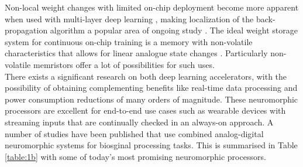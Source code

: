 \noindent Non-local weight changes with limited on-chip deployment become more apparent when used with multi-layer deep learning \cite{bellec2019eligibility}, making localization of the back-propagation algorithm a popular area of ongoing study \cite{sacramento2018dendritic}. The ideal weight storage system for continuous on-chip training is a memory with non-volatile characteristics that allows for linear analogue state changes \cite{valentian2019fully}. Particularly non-volatile memristors offer a lot of possibilities for such uses. \\

\noindent There exists a significant research on both deep learning accelerators, with the possibility of obtaining complementing benefits like real-time data processing and power consumption reductions of many orders of magnitude. These neuromorphic processors are excellent for end-to-end use cases such as wearable devices with streaming inputs that are continually checked in an always-on approach. A number of studies have been published that use combined analog-digital neuromorphic systems for biosginal processing tasks. This is summarised in Table \ref{table:1b} with some of today's most promising neuromorphic processors.\\

\begin{table}[h]
\caption{Neuromorphic platforms used for biosignal processing applications \cite{azghadi2020hardware}.}
\label{table:1b}
\end{table}

